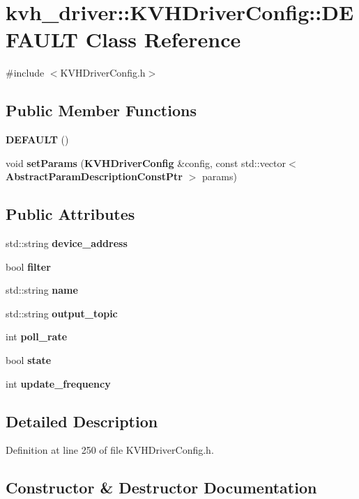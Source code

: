 \section{kvh\-\_\-driver\-:\-:\-K\-V\-H\-Driver\-Config\-:\-:\-D\-E\-F\-A\-U\-L\-T \-Class \-Reference}
\label{classkvh__driver_1_1KVHDriverConfig_1_1DEFAULT}


{\ttfamily \#include $<$\-K\-V\-H\-Driver\-Config.\-h$>$}

\subsection*{\-Public \-Member \-Functions}
\begin{DoxyCompactItemize}
\item 
{\bf \-D\-E\-F\-A\-U\-L\-T} ()
\item 
void {\bf set\-Params} ({\bf \-K\-V\-H\-Driver\-Config} \&config, const std\-::vector$<$ {\bf \-Abstract\-Param\-Description\-Const\-Ptr} $>$ params)
\end{DoxyCompactItemize}
\subsection*{\-Public \-Attributes}
\begin{DoxyCompactItemize}
\item 
std\-::string {\bf device\-\_\-address}
\item 
bool {\bf filter}
\item 
std\-::string {\bf name}
\item 
std\-::string {\bf output\-\_\-topic}
\item 
int {\bf poll\-\_\-rate}
\item 
bool {\bf state}
\item 
int {\bf update\-\_\-frequency}
\end{DoxyCompactItemize}


\subsection{\-Detailed \-Description}


\-Definition at line 250 of file \-K\-V\-H\-Driver\-Config.\-h.



\subsection{\-Constructor \& \-Destructor \-Documentation}
